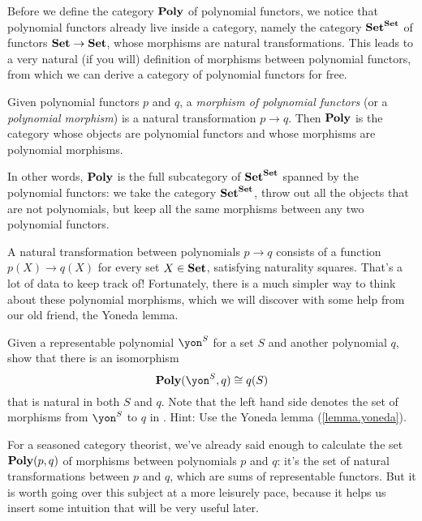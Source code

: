 \documentclass[Book-Poly]{subfiles}
\begin{document}
Before we define the category $\textbf{Poly}$ of polynomial functors, we notice that polynomial functors already live inside a category, namely the category $\textbf{Set}^{\textbf{Set}}$ of functors $\textbf{Set} \to \textbf{Set}$, whose morphisms are natural transformations.
This leads to a very natural (if you will) definition of morphisms between polynomial functors, from which we can derive a category of polynomial functors for free.

\begin{definition}
Given polynomial functors $p$ and $q$, a \emph{morphism of polynomial functors} (or a \emph{polynomial morphism}) is a natural transformation $p\to q$.
Then $\textbf{Poly}$ is the category whose objects are polynomial functors and whose morphisms are polynomial morphisms.
\end{definition}

In other words, $\textbf{Poly}$ is the full subcategory of $\textbf{Set}^{\textbf{Set}}$ spanned by the polynomial functors: we take the category $\textbf{Set}^{\textbf{Set}}$, throw out all the objects that are not polynomials, but keep all the same morphisms between any two polynomial functors.

A natural transformation between polynomials $p \to q$ consists of a function $p(X) \to q(X)$ for every set $X \in \textbf{Set}$, satisfying naturality squares.
That's a lot of data to keep track of!
Fortunately, there is a much simpler way to think about these polynomial morphisms, which we will discover with some help from our old friend, the Yoneda lemma.

\begin{exercise}
Given a representable polynomial $\yon^S$ for a set $S$ and another polynomial $q$, show that there is an isomorphism %
\[
    \poly(\yon^S, q) \iso q(S)
\]
that is natural in both $S$ and $q$. %
Note that the left hand side denotes the set of morphisms from $\yon^S$ to $q$ in \poly. Hint: Use the Yoneda lemma (\cref{lemma.yoneda}).
\end{exercise}

For a seasoned category theorist, we've already said enough to calculate the set $\textbf{Poly}(p,q)$ of morphisms between polynomials $p$ and $q$: it's the set of natural transformations between $p$ and $q$, which are sums of representable functors. But it is worth going over this subject at a more leisurely pace, because it helps us insert some intuition that will be very useful later.
\end{document}
